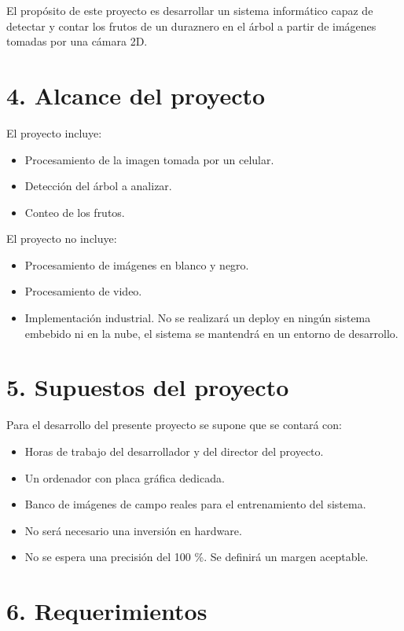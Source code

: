 \documentclass[
11pt %
]{charter}
\begin{document}
El propósito de este proyecto es desarrollar un sistema informático capaz de detectar y contar los frutos de un duraznero en el árbol a partir de imágenes tomadas por una cámara 2D.

\section{4. Alcance del proyecto}
\label{sec:alcance}


El proyecto incluye:
\begin{itemize}
	\item Procesamiento de la imagen tomada por un celular.
	\item Detección del árbol a analizar.
	\item Conteo de los frutos.
\end{itemize}

El proyecto no incluye:
\begin{itemize}
	\item Procesamiento de imágenes en blanco y negro.
	\item Procesamiento de video.
	\item Implementación industrial. No se realizará un deploy en ningún sistema embebido ni en la nube, el sistema se mantendrá en un entorno de desarrollo.
\end{itemize}


\section{5. Supuestos del proyecto}
\label{sec:supuestos}

Para el desarrollo del presente proyecto se supone que se contará con:

\begin{itemize}
    \item Horas de trabajo del desarrollador y del director del proyecto.
	\item Un ordenador con placa gráfica dedicada.
	\item Banco de imágenes de campo reales para el entrenamiento del sistema.
	\item No será necesario una inversión en hardware.
	\item No se espera una precisión del 100 \%. Se definirá un margen aceptable.
\end{itemize}

\section{6. Requerimientos}
\label{sec:requerimientos}
\end{document}
